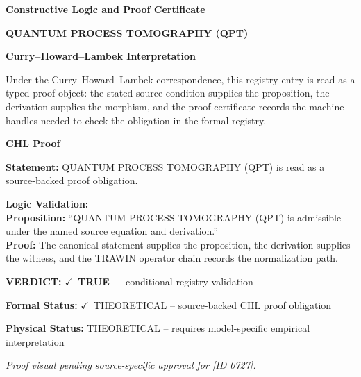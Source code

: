 \clearpage
\begingroup\tzpsupportsetup
\noindent\textbf{\fontsize{10.8pt}{12.8pt}\selectfont [ID 0727] Constructive Logic and Proof Certificate}\par
\noindent\textbf{\fontsize{10pt}{12pt}\selectfont QUANTUM PROCESS TOMOGRAPHY (QPT)}\par
\vspace{0.45em}
\begingroup
\footnotesize
\setlength{\parskip}{0.22em}
\setlength{\parindent}{0pt}
\noindent\textbf{Curry--Howard--Lambek Interpretation}\par
Under the Curry--Howard--Lambek correspondence, this registry entry is read as a typed proof
object: the stated source condition supplies the proposition, the derivation supplies the
morphism, and the proof certificate records the machine handles needed to check the obligation
in the formal registry.

\vspace{0.45em}
\noindent\textbf{CHL Proof}\par
\textbf{Statement:} QUANTUM PROCESS TOMOGRAPHY (QPT) is read as a source-backed proof obligation.

\textbf{Logic Validation:}\\
\textbf{Proposition:} ``QUANTUM PROCESS TOMOGRAPHY (QPT) is admissible under the named source equation and derivation.''\\
\textbf{Proof:} The canonical statement supplies the proposition, the derivation supplies the witness, and the TRAWIN operator chain records the normalization path.

\textbf{VERDICT:} \ensuremath{\checkmark}\ \textbf{TRUE} --- conditional registry validation

\textbf{Formal Status:} \ensuremath{\checkmark}\ THEORETICAL -- source-backed CHL proof obligation

\textbf{Physical Status:} THEORETICAL -- requires model-specific empirical interpretation
\par\vspace{0.45em}
\par
\vfill
\begingroup\footnotesize\itshape
Proof visual pending source-specific approval for [ID 0727].
\par\endgroup
\vfill
\endgroup
\endgroup
